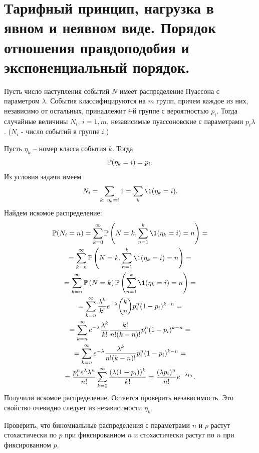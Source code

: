 \chapter{Тарифный принцип, нагрузка в явном и неявном виде. Порядок отношения правдоподобия и экспоненциальный порядок.}
\problem{}
Пусть число наступления событий $N$ имеет распределение Пуассона с параметром $\lambda$. События классифицируются на $m$ групп, причем каждое из них, независимо от остальных, принадлежит $i$-й группе с вероятностью $p_i$. Тогда случайные величины $N_i$, $i =\overline{1,m}$, независимые пуассоновские с параметрами $p_i\lambda$. ($N_i$ - число событий в группе $i$.)

\solution{}
    Пусть $\eta_k$ -- номер класса события $k$. Тогда
    \begin{equation}
        \P(\eta_k = i) = p_i.
    \end{equation}
    Из условия задачи имеем
    \begin{equation}
        N_i = \sum_{k:\ \eta_k = i} 1 = \sum_k \1(\eta_k = i).
    \end{equation}
    Найдем искомое распределение:
    \begin{multline}
        \P(N_i = n) =
        \sum_{k=0}^\infty \P\left(N=k, \sum_{n=1}^k\1(\eta_k = i) = n\right) =\\=
        \sum_{k=n}^\infty \P\left(N=k, \sum_{n=1}^k\1(\eta_k = i) = n\right) =\\=
        \sum_{k=n}^\infty \P\left(N=k\right) \P\left(\sum_{n=1}^k\1(\eta_k = i) = n\right) =\\=
        \sum_{k=n}^\infty \frac{\lambda^k}{k!}e^{-\lambda} \binom{k}{n}p_i^n(1-p_i)^{k-n} =\\=
        \sum_{k=n}^\infty e^{-\lambda} \frac{\lambda^k}{k!}\frac{k!}{n!(k-n)!} p_i^n(1-p_i)^{k-n} =\\=
        \sum_{k=n}^\infty e^{-\lambda} \frac{\lambda^k}{n!(k-n)!} p_i^n(1-p_i)^{k-n} =\\=
        \frac{p_i^ne^{\lambda}\lambda^n}{n!}\sum_{k=0}^\infty\frac{(\lambda(1-p_i))^{k}}{k!}  =
        \frac{(\lambda p_i)^n}{n!}e^{-\lambda p_i}.
    \end{multline}
    Получили искомое распределение. Остается проверить независимость. Это свойство очевидно следует из независимости $\eta_k$.

\problem{}
Проверить, что биномиальные распределения с параметрами $n$ и $p$ растут стохастически по $p$ при фиксированном $n$ и стохастически растут по $n$ при фиксированном $p$.

